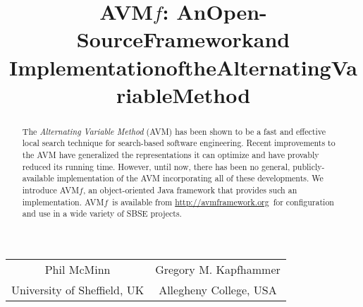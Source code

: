 \documentclass{llncs}
\newcommand{\AVM}{Alternating Variable Method\xspace}
\newcommand{\name}{\mbox{AVM\hspace{-1pt}$f$}\xspace}
\newcommand{\repourl}{\url{http://avmframework.org}\xspace}
\begin{document}
\title{\texorpdfstring{\name: An\:Open-Source\:Framework\:and\\$\!$$\!$$\!$Implementation\:of\:the\:Alternating\:Variable\:Method\vspace{-.75em}}{}}
\author{} %
\institute{} %
\maketitle

\vspace{-2em}
\begin{center}
\begin{tabular}{c@{\hskip 3em}c}
                Phil McMinn & Gregory M. Kapfhammer \\
                {\small University of Sheffield, UK} & {\small Allegheny College, USA} \\
\end{tabular}
\end{center}
\vspace{-2em}


\begin{abstract}
The {\it \AVM\/} (AVM) has been shown to be a fast and effective local search technique for %
search-based software engineering.
%
Recent improvements to the AVM have generalized the
representations it can optimize and have provably reduced its running time.
However, until now, there has been no general, publicly-available
implementation of the AVM
incorporating
all of these developments.
We introduce \name, an object-oriented
Java framework
that provides
such an implementation. \name~is available from \repourl~for configuration and use in a wide variety of SBSE projects.\vspace{-1ex}
\end{abstract}

\vspace{-2.5em}
\end{document}
